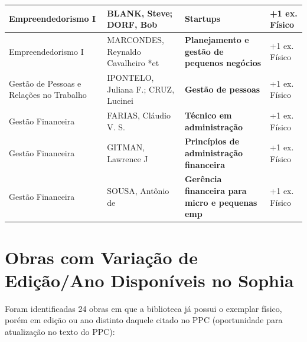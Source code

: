 \documentclass[10pt,a4paper]{article}
\begin{document}
\begin{xltabular}{\linewidth}{|p{3.8cm}|p{3.2cm}|X|p{2.2cm}|}
Empreendedorismo I & BLANK, Steve; DORF, Bob & \textbf{Startups} & +1 ex. Físico \\ \hline
Empreendedorismo I & MARCONDES, Reynaldo Cavalheiro *et & \textbf{Planejamento e gestão de pequenos negócios} & +1 ex. Físico \\ \hline
Gestão de Pessoas e Relações no Trabalho & IPONTELO, Juliana F.; CRUZ, Lucinei & \textbf{Gestão de pessoas} & +1 ex. Físico \\ \hline
Gestão Financeira & FARIAS, Cláudio V. S. & \textbf{Técnico em administração} & +1 ex. Físico \\ \hline
Gestão Financeira & GITMAN, Lawrence J & \textbf{Princípios de administração financeira} & +1 ex. Físico \\ \hline
Gestão Financeira & SOUSA, Antônio de & \textbf{Gerência financeira para micro e pequenas emp} & +1 ex. Físico \\ \hline
\end{xltabular}

\newpage
\section{Obras com Variação de Edição/Ano Disponíveis no Sophia}
Foram identificadas 24 obras em que a biblioteca já possui o exemplar físico, porém em edição ou ano distinto daquele citado no PPC (oportunidade para atualização no texto do PPC):
\end{document}

